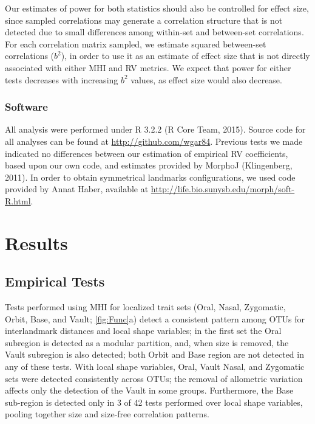 \documentclass[12pt,twoside]{report}
\begin{document}
Our estimates of power for both statistics should also be controlled for
effect size, since sampled correlations may generate a correlation
structure that is not detected due to small differences among within-set
and between-set correlations. For each correlation matrix sampled, we
estimate squared between-set correlations ($b^2$), in order to use it as
an estimate of effect size that is not directly associated with either
MHI and RV metrics. We expect that power for either tests decreases with
increasing $b^2$ values, as effect size would also decrease.

\subsubsection{Software}\label{software}

All analysis were performed under R 3.2.2 (R Core Team, 2015). Source
code for all analyses can be found at \url{http://github.com/wgar84}.
Previous tests we made indicated no differences between our estimation
of empirical RV coefficients, based upon our own code, and estimates
provided by MorphoJ (Klingenberg, 2011). In order to obtain symmetrical
landmarks configurations, we used code provided by Annat Haber,
available at \url{http://life.bio.sunysb.edu/morph/soft-R.html}.

\section{Results}\label{results}

\subsection{Empirical Tests}\label{empirical-tests-1}

Tests performed using MHI for localized trait sets (Oral, Nasal,
Zygomatic, Orbit, Base, and Vault; \autoref{fig:Func}a) detect a
consistent pattern among OTUs for interlandmark distances and local
shape variables; in the first set the Oral subregion is detected as a
modular partition, and, when size is removed, the Vault subregion is
also detected; both Orbit and Base region are not detected in any of
these tests. With local shape variables, Oral, Vault Nasal, and
Zygomatic sets were detected consistently across OTUs; the removal of
allometric variation affects only the detection of the Vault in some
groups. Furthermore, the Base sub-region is detected only in 3 of 42
tests performed over local shape variables, pooling together size and
size-free correlation patterns.
\end{document}
